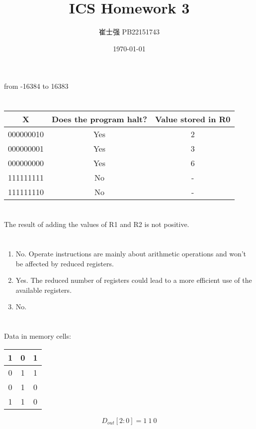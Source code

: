 \documentclass[UTF8]{ctexart}
\title{ICS Homework 3}
\author{崔士强 PB22151743}
\date{\today}
\begin{document}
\maketitle
\section{}  %
from -16384 to 16383
\section{}  %
\begin{table}[H]
  \centering
  \begin{tabular}{ccc}
    \hline\hline
    X & Does the program halt? & Value stored in R0 \\
    \hline
    000000010 & Yes & 2 \\
    000000001 & Yes & 3 \\
    000000000 & Yes & 6 \\
    111111111 & No & - \\
    111111110 & No & - \\
    \hline\hline
  \end{tabular}
\end{table}
\section{}  %
The result of adding the values of R1 and R2 is not positive. 
\section{}  %
\begin{enumerate}
  \item No. Operate instructions are mainly about arithmetic operations and won't be affected by reduced registers.
  \item Yes. The reduced number of registers could lead to a more efficient use of the available registers. 
  \item No.
\end{enumerate}
\section{}  %
Data in memory cells:
\begin{table}[H]
  \centering
  \begin{tabular}{|c|c|c|}
    \hline
    1 & 0 & 1 \\
    \hline
    0 & 1 & 1 \\
    \hline
    0 & 1 & 0 \\
    \hline
    1 & 1 & 0 \\
    \hline
  \end{tabular}
\end{table}
\[D_{out}[2:0] = 1\ 1\ 0\]
\end{document}
